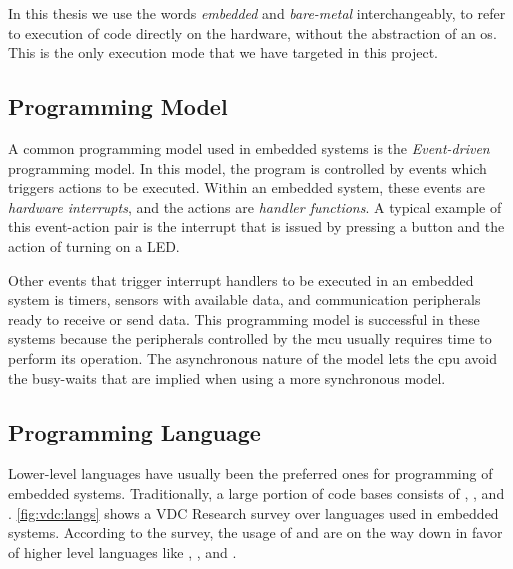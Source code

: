 In this thesis we use the words \emph{embedded} and \emph{bare-metal} interchangeably, to refer to execution of code directly on the hardware, without the abstraction of an \gls{os}.
This is the only execution mode that we have targeted in this project.

\subsection{Programming Model}

A common programming model used in embedded systems is the \emph{Event-driven} programming model.
In this model, the program is controlled by events which triggers actions to be executed.
Within an embedded system, these events are \emph{hardware interrupts}, and the actions are \emph{handler functions}.
A typical example of this event-action pair is the interrupt that is issued by pressing a button and the action of turning on a LED.

Other events that trigger interrupt handlers to be executed in an embedded system is timers, sensors with available data, and communication peripherals ready to receive or send data.
This programming model is successful in these systems because the peripherals controlled by the \gls{mcu} usually requires time to perform its operation.
The asynchronous nature of the model lets the \gls{cpu} avoid the busy-waits that are implied when using a more synchronous model.

\subsection{Programming Language}

Lower-level languages have usually been the preferred ones for programming of embedded systems.
Traditionally, a large portion of code bases consists of {\C}, , and {\Cpp}.
\autoref{fig:vdc:langs} shows a VDC Research \cite{web:vdc} survey over languages used in embedded systems.
According to the survey, the usage of {\C} and  are on the way down in favor of higher level languages like , , and .


